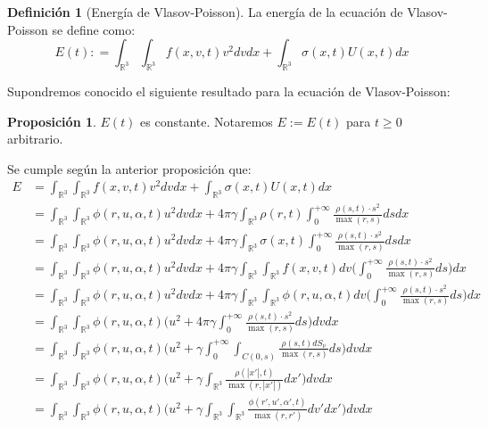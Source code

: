 \documentclass[a4paper,10pt]{scrartcl}
\theoremstyle{definition}
\newtheorem*{definition}{Definición}
\newtheorem{fact}{Proposición}
\numberwithin{equation}{section}
\begin{document}
\begin{definition}[Energía de Vlasov-Poisson]
La energía de la ecuación de Vlasov-Poisson se define como:
\[
 E(t): = \int_{\mathbb{R}^3}\int_{\mathbb{R}^3} f(x,v,t) v^2 dv dx + \int_{\mathbb{R}^3} \sigma(x,t) U(x,t) dx
\]
\end{definition}

Supondremos conocido el siguiente resultado para la ecuación de Vlasov-Poisson:
\begin{fact}
 $E(t)$ es constante. Notaremos $E := E(t)$ para $t\ge 0$ arbitrario.
\end{fact}

Se cumple según la anterior proposición que:
\begin{align*}
 E &= \int_{\mathbb{R}^3}\int_{\mathbb{R}^3} f(x,v,t) v^2 dv dx + \int_{\mathbb{R}^3} \sigma(x,t) U(x,t) dx \\
 &= \int_{\mathbb{R}^3}\int_{\mathbb{R}^3} \phi(r,u,\alpha,t) u^2 dv dx + 4\pi\gamma\int_{\mathbb{R}^3} \rho(r,t) \int_0^{+\infty} \frac{\rho(s,t)\cdot s^2}{\max(r,s)} ds dx \\
 &= \int_{\mathbb{R}^3}\int_{\mathbb{R}^3} \phi(r,u,\alpha,t) u^2 dv dx + 4\pi\gamma\int_{\mathbb{R}^3} \sigma(x,t) \int_0^{+\infty} \frac{\rho(s,t)\cdot s^2}{\max(r,s)} ds dx \\
 &= \int_{\mathbb{R}^3}\int_{\mathbb{R}^3} \phi(r,u,\alpha,t) u^2 dv dx + 4\pi\gamma\int_{\mathbb{R}^3} \int_{\mathbb{R}^3} f(x,v,t) dv \bigg(\int_0^{+\infty} \frac{\rho(s,t)\cdot s^2}{\max(r,s)} ds \bigg)dx \\
 &= \int_{\mathbb{R}^3}\int_{\mathbb{R}^3} \phi(r,u,\alpha,t) u^2 dv dx + 4\pi\gamma\int_{\mathbb{R}^3} \int_{\mathbb{R}^3} \phi(r,u,\alpha,t) dv \bigg(\int_0^{+\infty} \frac{\rho(s,t)\cdot s^2}{\max(r,s)} ds \bigg)dx \\
 &= \int_{\mathbb{R}^3}\int_{\mathbb{R}^3} \phi(r,u,\alpha,t) \bigg(u^2 + 4\pi\gamma\int_0^{+\infty} \frac{\rho(s,t)\cdot s^2}{\max(r,s)} ds \bigg)dv dx \\
 &= \int_{\mathbb{R}^3}\int_{\mathbb{R}^3} \phi(r,u,\alpha,t) \bigg(u^2 + \gamma\int_0^{+\infty} \int_{C(0,s)}\frac{\rho(s,t) dS_{\nu}}{\max(r,s)} ds \bigg)dv dx \\
 &= \int_{\mathbb{R}^3}\int_{\mathbb{R}^3} \phi(r,u,\alpha,t) \bigg(u^2 + \gamma\int_{\mathbb{R}^3} \frac{\rho(|x'|, t)}{\max(r,|x'|)} dx' \bigg)dv dx \\
 &= \int_{\mathbb{R}^3}\int_{\mathbb{R}^3} \phi(r,u,\alpha,t) \bigg(u^2 + \gamma\int_{\mathbb{R}^3} \int_{\mathbb{R}^3} \frac{\phi(r',u',\alpha',t)}{\max(r,r')} dv' dx' \bigg)dv dx \\

\end{align*}
\end{document}
